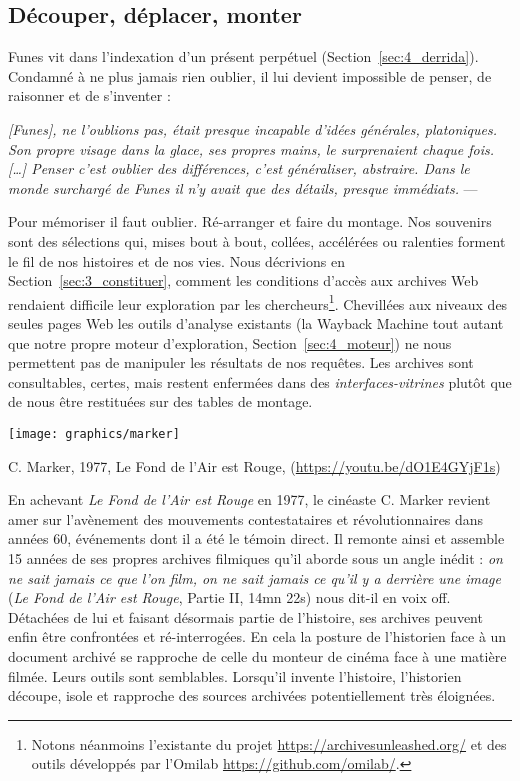 \documentclass[symmetric,justified,marginals=raggedouter]{tufte-book}
\begin{document}
\subsection{Découper, déplacer, monter}

\noindent Funes vit dans l'indexation d'un présent perpétuel (Section~\ref{sec:4_derrida}). Condamné à ne plus jamais rien oublier, il lui devient impossible de penser, de raisonner et de s'inventer :

\begin{fullwidth}
\og\textit{[Funes], ne l’oublions pas, était presque incapable d’idées générales, platoniques. Son propre visage dans la glace, ses propres mains, le surprenaient chaque fois. [\ldots{}] Penser c'est oublier des différences, c'est généraliser, abstraire. Dans le monde surchargé de Funes il n'y avait que des détails, presque immédiats.}\fg{} --- \citep[p.117-118]{borges_fictions_1974}\\
\end{fullwidth} 

\noindent Pour mémoriser il faut oublier. Ré-arranger et faire du montage. Nos souvenirs sont des sélections qui, mises bout à bout, collées, accélérées ou ralenties forment le fil de nos histoires et de nos vies. Nous décrivions en Section~\ref{sec:3_constituer}, comment les conditions d'accès aux archives Web rendaient difficile leur exploration par les chercheurs\footnote{\RaggedOuter Notons  néanmoins l'existante du projet \url{https://archivesunleashed.org/} et des outils développés par l'Omilab \url{https://github.com/omilab/}.}. Chevillées aux niveaux des seules pages Web les outils d'analyse existants (la Wayback Machine tout autant que notre propre moteur d'exploration, Section~\ref{sec:4_moteur}) ne nous permettent pas de manipuler les résultats de nos requêtes. Les archives sont consultables, certes, mais restent enfermées dans des \textit{interfaces-vitrines} plutôt que de nous être restituées sur des tables de montage. 

\begin{marginfigure}%
  \texttt{[image: graphics/marker]}
  \caption{C. Marker, 1977, Le Fond de l'Air est Rouge, (\url{https://youtu.be/dO1E4GYjF1s})}
  \label{fig:marker}
\end{marginfigure}

En achevant \textit{Le Fond de l'Air est Rouge} en 1977, le cinéaste C. Marker revient amer sur l'avènement des mouvements contestataires et révolutionnaires dans années 60, événements dont il a été le témoin direct. Il remonte ainsi et assemble 15 années de ses propres archives filmiques qu'il aborde sous un angle inédit : \og\textit{on ne sait jamais ce que l'on film, on ne sait jamais ce qu'il y a derrière une image}\fg{} (\textit{Le Fond de l'Air est Rouge}, Partie II, 14mn 22s) nous dit-il en voix off. Détachées de lui et faisant désormais partie de l'histoire, ses archives peuvent enfin être confrontées et ré-interrogées. En cela la posture de l'historien face à un document archivé se rapproche de celle du monteur de cinéma face à une matière filmée. Leurs outils sont semblables. Lorsqu'il invente l'histoire, l'historien découpe, isole et rapproche des sources archivées potentiellement très éloignées. 
\end{document}
